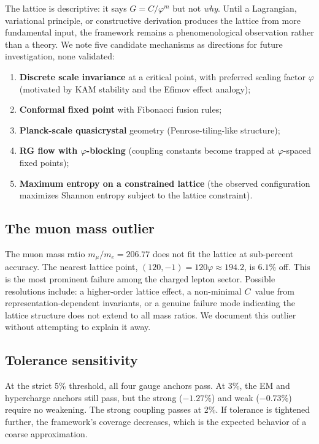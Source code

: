 \documentclass[12pt,a4paper]{article}
\newcommand{\vp}{\varphi}
\begin{document}
The lattice is descriptive: it says $G = C/\vp^m$ but not \emph{why}.  Until
a Lagrangian, variational principle, or constructive derivation produces the
lattice from more fundamental input, the framework remains a phenomenological
observation rather than a theory.  We note five candidate mechanisms as
directions for future investigation, none validated:
\begin{enumerate}[nosep]
  \item \textbf{Discrete scale invariance} at a critical point, with
    preferred scaling factor $\vp$ (motivated by KAM stability and the
    Efimov effect analogy);
  \item \textbf{Conformal fixed point} with Fibonacci fusion rules;
  \item \textbf{Planck-scale quasicrystal} geometry
    (Penrose-tiling-like structure);
  \item \textbf{RG flow with $\vp$-blocking} (coupling constants become
    trapped at $\vp$-spaced fixed points);
  \item \textbf{Maximum entropy on a constrained lattice} (the observed
    configuration maximizes Shannon entropy subject to the lattice constraint).
\end{enumerate}

\subsection{The muon mass outlier}
\label{sec:muon}

The muon mass ratio $m_\mu/m_e = 206.77$ does not fit the lattice at
sub-percent accuracy.  The nearest lattice point, $(120, -1) = 120\vp
\approx 194.2$, is $6.1\%$ off.  This is the most prominent failure among
the charged lepton sector.  Possible resolutions include: a higher-order
lattice effect, a non-minimal $C$~value from representation-dependent
invariants, or a genuine failure mode indicating the lattice structure does
not extend to all mass ratios.  We document this outlier without attempting
to explain it away.

\subsection{Tolerance sensitivity}
\label{sec:tolerance}

At the strict 5\% threshold, all four gauge anchors pass.  At 3\%, the EM
and hypercharge anchors still pass, but the strong ($-1.27\%$) and weak
($-0.73\%$) require no weakening.  The strong coupling passes at 2\%.  If
tolerance is tightened further, the framework's coverage decreases, which is
the expected behavior of a coarse approximation.
\end{document}
